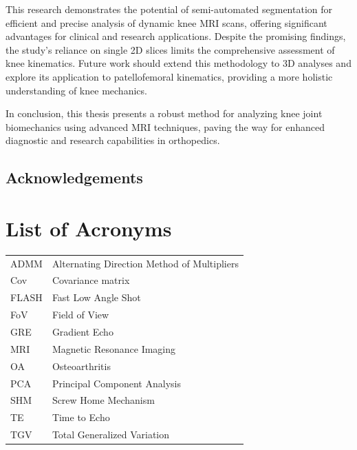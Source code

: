 \documentclass{micro-econ-thesis}
\begin{document}
This research demonstrates the potential of semi-automated segmentation for efficient and precise analysis of dynamic knee MRI scans, offering significant advantages for clinical and research applications. Despite the promising findings, the study's reliance on single 2D slices limits the comprehensive assessment of knee kinematics. Future work should extend this methodology to 3D analyses and explore its application to patellofemoral kinematics, providing a more holistic understanding of knee mechanics.

In conclusion, this thesis presents a robust method for analyzing knee joint biomechanics using advanced MRI techniques, paving the way for enhanced diagnostic and research capabilities in orthopedics.

\clearpage
\subsection*{Acknowledgements}


\cleardoublepage
\tableofcontents

\cleardoublepage
{}
{}
\listoffigures
\cleardoublepage
{}
{}
\listoftables

\cleardoublepage
{}
{}
\section*{List of Acronyms}
\begin{tabular}{@{}ll}
ADMM & Alternating Direction Method of Multipliers \\
Cov & Covariance matrix \\ 
FLASH & Fast Low Angle Shot \\
FoV & Field of View \\
GRE & Gradient Echo \\
MRI & Magnetic Resonance Imaging \\
OA & Osteoarthritis\\
PCA & Principal Component Analysis \\
SHM & Screw Home Mechanism \\
TE & Time to Echo \\
TGV & Total Generalized Variation 

\end{tabular}
\end{document}
